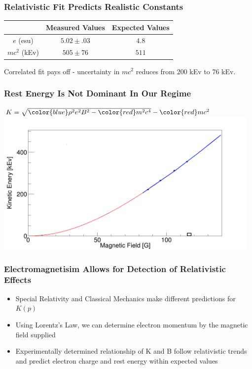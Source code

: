\documentclass{beamer}
\begin{document}
\begin{frame}
  \frametitle{Relativistic Fit Predicts Realistic Constants}
  \begin{center}
\begin{ruledtabular}
    \begin{tabular}{ccc}
      \hspace{52pt}\vline&  Measured Values & Expected Values \\
      \hline
      $e$ (esu) \hspace{12pt}    \vline& $5.02 \pm .03$ & $4.8$ \\
      $mc^2$ (kEv) \vline& $505 \pm 76$ & $511$ \\
    \end{tabular}
  \end{ruledtabular}
\end{center}
Correlated fit pays off - uncertainty in $mc^2$ reduces from $200$ kEv to 76 kEv.
\end{frame}

\begin{frame}
  \frametitle{Rest Energy Is Not Dominant In Our Regime}
  \begin{center}
    $K = \sqrt{{\color{blue}\rho^2 e^2 B^2} - {\color{red} m^2 c^4}} - {\color{red} mc^2}$
  \includegraphics[width=13cm]{error.png}
\end{center}
\end{frame}

\begin{frame}
  \frametitle{Electromagnetisim Allows for Detection of Relativistic Effects}
  \begin{itemize}
    \pause
  \item Special Relativity and Classical Mechanics make different predictions for $K(p)$
    \pause
  \item Using Lorentz's Law, we can determine electron momentum by the magnetic field supplied
    \pause
  \item Experimentally determined relationship of K and B follow relativistic trends and predict electron charge and rest energy within expected values
\end{itemize}
\end{frame}
\end{document}
